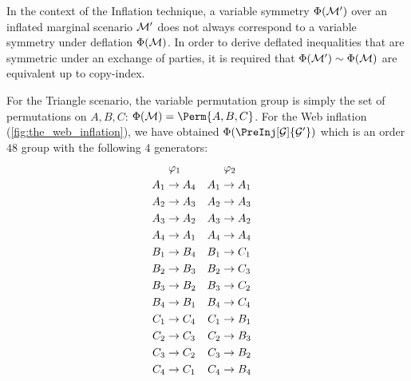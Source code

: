 \documentclass[aps, 10pt, english, twoside, pra, nofootinbib, tightenlines, longbibliography]{revtex4-1}
\begin{document}
    In the context of the Inflation technique, a variable symmetry $\Phi\br{\mscenario'}$ over an inflated marginal scenario $\mathcal{M}'$ does not always correspond to a variable symmetry under deflation $\Phi\br{\mscenario}$. In order to derive deflated inequalities that are symmetric under an exchange of parties, it is required that $\Phi\br{\mscenario'} \sim \Phi\br{\mscenario}$ are equivalent up to copy-index.

    For the Triangle scenario, the variable permutation group is simply the set of permutations on $A, B, C$: $\Phi\br{\mscenario} = \Perm{A, B, C}$. For the Web inflation (\cref{fig:the_web_inflation}), we have obtained $\gp\br{\PreInj[\graph]{\graph'}}$ which is an order $48$ group with the following $4$ generators:
    \begin{equation*}
    \begin{aligned}[c]
    &\hspace{1mm}\varphi_1 \\
    A_1 &\to A_4 \\A_2 &\to A_3 \\A_3 &\to A_2 \\A_4 &\to A_1 \\B_1 &\to B_4 \\B_2 &\to B_3 \\B_3 &\to B_2 \\B_4 &\to B_1 \\C_1 &\to C_4 \\C_2 &\to C_3 \\C_3 &\to C_2 \\C_4 &\to C_1
    \end{aligned}
    \quad
    \begin{aligned}[c]
    &\hspace{1mm}\varphi_2 \\
    A_1 &\to A_1 \\A_2 &\to A_3 \\A_3 &\to A_2 \\A_4 &\to A_4 \\B_1 &\to C_1 \\B_2 &\to C_3 \\B_3 &\to C_2 \\B_4 &\to C_4 \\C_1 &\to B_1 \\C_2 &\to B_3 \\C_3 &\to B_2 \\C_4 &\to B_4
    \end{aligned}
    \quad
    \begin{aligned}[c]

\end{aligned}
\end{equation*}
\end{document}
